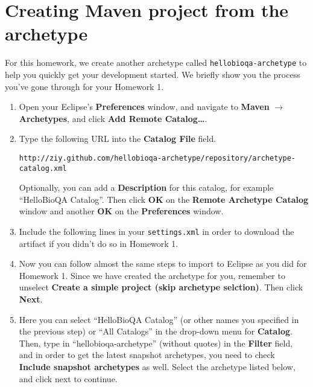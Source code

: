 
\section{Creating Maven project from the archetype}

For this homework, we create another archetype called
\texttt{hellobioqa-archetype} to help you quickly get your development started.
We briefly show you the process you've gone through for your Homework 1.

\begin{enumerate}

\item Open your Eclipse's \textbf{Preferences} window, and navigate to
\textbf{Maven} $\rightarrow$ \textbf{Archetypes}, and click \textbf{Add Remote
Catalog\ldots}.

\item Type the following URL into the \textbf{Catalog File} field.

\small
\begin{verbatim}
http://ziy.github.com/hellobioqa-archetype/repository/archetype-catalog.xml
\end{verbatim}
\normalsize

Optionally, you can add a \textbf{Description} for this catalog, for example
``HelloBioQA Catalog''. Then click \textbf{OK} on the \textbf{Remote Archetype
Catalog} window and another \textbf{OK} on the \textbf{Preferences} window.

\item Include the following lines in your \texttt{settings.xml} in order to
download the artifact if you didn't do so in Homework 1.



\item Now you can follow almost the same steps to import to Eclipse as you did
for Homework 1. Since we have created the archetype for you, remember to
unselect \textbf{Create a simple project (skip archetype selction)}. Then click
\textbf{Next}.
 
\item Here you can select ``HelloBioQA Catalog'' (or other names you specified
in the previous step) or ``All Catalogs'' in the drop-down menu for
\textbf{Catalog}. Then, type in ``hellobioqa-archetype'' (without quotes) in the \textbf{Filter}
field, and in order to get the latest snapshot archetypes, you need to check
\textbf{Include snapshot archetypes} as well. Select the archetype listed below,
and click next to continue.


\end{enumerate}
